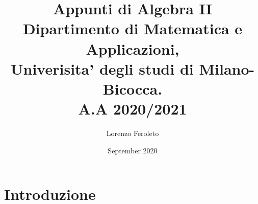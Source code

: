 \documentclass{article}
\title{
  \Large{\bf{Appunti di Algebra II}} \\
  Dipartimento di Matematica e Applicazioni,\\
  Univerisita' degli studi di Milano-Bicocca. \\
  A.A 2020/2021
}
\author{Lorenzo Feroleto}
\date{September 2020}
\begin{document}
\maketitle
\newpage

\section{Introduzione}
\begin{defn}[Prova]
  \lipsum[10]
\end{defn}
\end{document}
